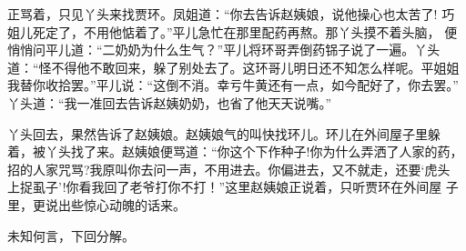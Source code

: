 正骂着，只见丫头来找贾环。凤姐道：“你去告诉赵姨娘，说他操心也太苦了!
巧姐儿死定了，不用他惦着了。”平儿急忙在那里配药再熬。那丫头摸不着头脑，
便悄悄问平儿道：“二奶奶为什么生气？”平儿将环哥弄倒药铞子说了一遍。丫头
道：“怪不得他不敢回来，躲了别处去了。这环哥儿明日还不知怎么样呢。平姐姐
我替你收拾罢。”平儿说：“这倒不消。幸亏牛黄还有一点，如今配好了，你去罢。”
丫头道：“我一准回去告诉赵姨奶奶，也省了他天天说嘴。”

丫头回去，果然告诉了赵姨娘。赵姨娘气的叫快找环儿。环儿在外间屋子里躲
着，被丫头找了来。赵姨娘便骂道：“你这个下作种子!你为什么弄洒了人家的药，
招的人家咒骂?我原叫你去问一声，不用进去。你偏进去，又不就走，还要‘虎头
上捉虱子’!你看我回了老爷打你不打！”这里赵姨娘正说着，只听贾环在外间屋
子里，更说出些惊心动魄的话来。

未知何言，下回分解。